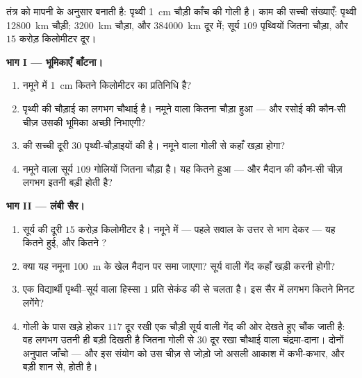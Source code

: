 \begin{problem}[{सप्ताहांत समस्या --- कक्षा खेल के मैदान पर
सूर्य--पृथ्वी--चंद्रमा तंत्र बनाती है; काँच की गोलियाँ, काली मिर्च के
दाने और एक बहुत लंबी सैर; और नमूने में शामिल होता झुकाव}]\label{pb:g6:sun-earth-moon:1}
 तंत्र को मापनी के अनुसार बनाती है: पृथ्वी \qty{1}{cm} चौड़ी काँच
की गोली है। काम की सच्ची संख्याएँ: पृथ्वी \qty{12800}{km} चौड़ी;
 \qty{3200}{km} चौड़ा, और \qty{384000}{km} दूर  में; सूर्य
$109$ पृथ्वियों जितना चौड़ा, और $15$ करोड़ किलोमीटर दूर।

\medskip\noindent\textbf{भाग I --- भूमिकाएँ बाँटना।}
\begin{enumerate}
  \item नमूने में \qty{1}{cm} कितने किलोमीटर का प्रतिनिधि है?
  \item {} पृथ्वी की चौड़ाई का लगभग चौथाई है। नमूने वाला 
        कितना चौड़ा हुआ --- और रसोई की कौन-सी चीज़ उसकी भूमिका अच्छी
        निभाएगी?
  \item {} की सच्ची दूरी $30$ पृथ्वी-चौड़ाइयों की है। नमूने वाला
         गोली से कहाँ खड़ा होगा?
  \item नमूने वाला सूर्य $109$ गोलियों जितना चौड़ा है। यह कितने
         हुआ --- और मैदान की कौन-सी चीज़ लगभग इतनी बड़ी
        होती है?
\end{enumerate}

\medskip\noindent\textbf{भाग II --- लंबी सैर।}
\begin{enumerate}[resume]
  \item सूर्य की दूरी $15$ करोड़ किलोमीटर है। नमूने में --- पहले सवाल
        के उत्तर से भाग देकर --- यह कितने  हुई, और कितने
        ?
  \item क्या यह नमूना \qty{100}{m} के खेल मैदान पर समा जाएगा?
        सूर्य वाली गेंद कहाँ खड़ी करनी होगी?
  \item एक विद्यार्थी पृथ्वी--सूर्य वाला हिस्सा $1$  प्रति सेकंड
        की  से चलता है। इस सैर में लगभग कितने मिनट लगेंगे?
  \item गोली के पास खड़े होकर $117$  दूर रखी एक  चौड़ी सूर्य
        वाली गेंद की ओर देखते हुए  चौंक जाती है: वह लगभग उतनी ही
        बड़ी दिखती है जितना गोली से $30$  दूर रखा चौथाई
         वाला चंद्रमा-दाना। दोनों अनुपात जाँचो --- और इस
        संयोग को उस चीज़ से जोड़ो जो असली आकाश में कभी-कभार, और बड़ी
        शान से, होती है।
\end{enumerate}


\end{problem}
